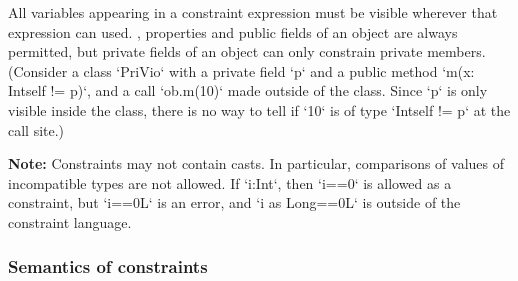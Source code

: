 All variables appearing in a constraint expression must be visible wherever
that expression can used.  \Eg, properties and public fields of an object are
always permitted, but private fields of an object can only constrain private
members.  (Consider a class \xcd`PriVio` with a private field \xcd`p` and a
public method \xcd`m(x: Int{self != p})`, and a call \xcd`ob.m(10)` made
outside of the class. Since \xcd`p` is only visible inside the class, there is
no way to tell if \xcd`10` is of type \xcd`Int{self != p}` at the call site.)

{\bf Note:} Constraints may not contain casts.   In particular, comparisons of
values of incompatible types are not allowed.  If \xcd`i:Int`, then \xcd`i==0`
is allowed as a constraint, but \xcd`i==0L` is an error, and 
\xcd`i as Long==0L` is outside of the constraint language.


\subsubsection{Semantics of constraints}
\label{SemanticsOfConstraints}


